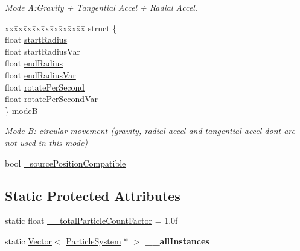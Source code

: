 \begin{DoxyCompactItemize}
\begin{tabbing}
\end{tabbing}\begin{DoxyCompactList}\small\item\em Mode A\+:Gravity + Tangential Accel + Radial Accel. \end{DoxyCompactList}\item 
\mbox{\label{classParticleSystem_a329d3f4fd0dde2b3e69882783c977a58}} 
\begin{tabbing}
xx\=xx\=xx\=xx\=xx\=xx\=xx\=xx\=xx\=\kill
struct \{\\
\>float \hyperlink{classParticleSystem_ad3033aadd088e0d11192096f5ad66384}{startRadius}\\
\>float \hyperlink{classParticleSystem_a6144edbe628515ebe32c57c2c67e35cc}{startRadiusVar}\\
\>float \hyperlink{classParticleSystem_a26521c52751fab3520bfd1edbddb581f}{endRadius}\\
\>float \hyperlink{classParticleSystem_a9a50b646561863981982c5e850ee1c8b}{endRadiusVar}\\
\>float \hyperlink{classParticleSystem_abc209d18b4cfab32d2ee47bbda8300c9}{rotatePerSecond}\\
\>float \hyperlink{classParticleSystem_a3aa049ca97987019baed0d0bd959b18b}{rotatePerSecondVar}\\
\} \hyperlink{classParticleSystem_a329d3f4fd0dde2b3e69882783c977a58}{modeB}\\

\end{tabbing}\begin{DoxyCompactList}\small\item\em Mode B\+: circular movement (gravity, radial accel and tangential accel don\textquotesingle{}t are not used in this mode) \end{DoxyCompactList}\item 
bool \hyperlink{classParticleSystem_a568a9266388bde9d2e8bfcc8cdde113d}{\+\_\+source\+Position\+Compatible}
\end{DoxyCompactItemize}
\subsection*{Static Protected Attributes}
\begin{DoxyCompactItemize}
\item 
static float \hyperlink{classParticleSystem_a0e11eafdab296fcc1976baffcb1e4741}{\+\_\+\+\_\+total\+Particle\+Count\+Factor} = 1.\+0f
\item 
\mbox{\label{classParticleSystem_a7a98f4b425bb4d43c41e59c54a2cff16}} 
static \hyperlink{classVector}{Vector}$<$ \hyperlink{classParticleSystem}{Particle\+System} $\ast$ $>$ {\bfseries \+\_\+\+\_\+all\+Instances}
\end{DoxyCompactItemize}
